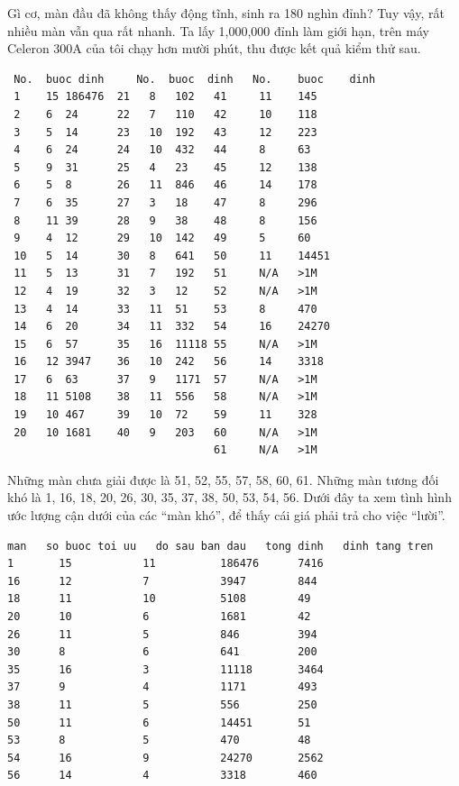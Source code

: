 \documentclass[11pt]{article}
\begin{document}
Gì cơ, màn đầu đã không thấy động tĩnh, sinh ra 180 nghìn đỉnh? Tuy vậy, rất
nhiều màn vẫn qua rất nhanh. Ta lấy 1,000,000 đỉnh làm giới hạn, trên máy
Celeron 300A của tôi chạy hơn mười phút, thu được kết quả kiểm thử sau.

\begin{verbatim}
 No.  buoc dinh     No.  buoc  dinh   No.    buoc    dinh
 1    15 186476  21   8   102   41     11    145
 2    6  24      22   7   110   42     10    118
 3    5  14      23   10  192   43     12    223
 4    6  24      24   10  432   44     8     63
 5    9  31      25   4   23    45     12    138
 6    5  8       26   11  846   46     14    178
 7    6  35      27   3   18    47     8     296
 8    11 39      28   9   38    48     8     156
 9    4  12      29   10  142   49     5     60
 10   5  14      30   8   641   50     11    14451
 11   5  13      31   7   192   51     N/A   >1M
 12   4  19      32   3   12    52     N/A   >1M
 13   4  14      33   11  51    53     8     470
 14   6  20      34   11  332   54     16    24270
 15   6  57      35   16  11118 55     N/A   >1M
 16   12 3947    36   10  242   56     14    3318
 17   6  63      37   9   1171  57     N/A   >1M
 18   11 5108    38   11  556   58     N/A   >1M
 19   10 467     39   10  72    59     11    328
 20   10 1681    40   9   203   60     N/A   >1M
                                61     N/A   >1M
\end{verbatim}

Những màn chưa giải được là 51, 52, 55, 57, 58, 60, 61. Những màn tương đối
khó là 1, 16, 18, 20, 26, 30, 35, 37, 38, 50, 53, 54, 56. Dưới đây ta xem
tình hình ước lượng cận dưới của các ``màn khó'', để thấy cái giá phải trả
cho việc ``lười''.

\begin{verbatim}
man   so buoc toi uu   do sau ban dau   tong dinh   dinh tang tren
1       15           11          186476      7416
16      12           7           3947        844
18      11           10          5108        49
20      10           6           1681        42
26      11           5           846         394
30      8            6           641         200
35      16           3           11118       3464
37      9            4           1171        493
38      11           5           556         250
50      11           6           14451       51
53      8            5           470         48
54      16           9           24270       2562
56      14           4           3318        460
\end{verbatim}
\end{document}
